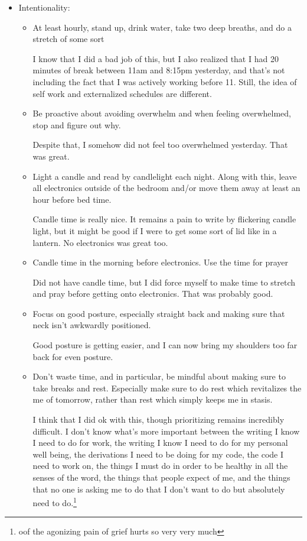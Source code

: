 \documentclass[12pt]{article}[titlepage]
\renewcommand{\,}{\textsuperscript{,}}
\begin{document}
\begin{itemize}   
\item Intentionality:  
\begin{itemize}  
\item At least hourly, stand up, drink water, take two deep breaths, and do a stretch of some sort

I know that I did a bad job of this, but I also realized that I had 20 minutes of break between 11am and 8:15pm yesterday, and that's not including the fact that I was actively working before 11. Still, the idea of self work and externalized schedules are different.  
\item Be proactive about avoiding overwhelm and when feeling overwhelmed, stop and figure out why.

Despite that, I somehow did not feel too overwhelmed yesterday. That was great.  
\item Light a candle and read by candlelight each night. Along with this, leave all electronics outside of the bedroom and/or move them away at least an hour before bed time.

Candle time is really nice.  
It remains a pain to write by flickering candle light, but it might be good if I were to get some sort of lid like in a lantern.  
No electronics was great too.  
\item Candle time in the morning before electronics. Use the time for prayer

Did not have candle time, but I did force myself to make time to stretch and pray before getting onto electronics.  
That was probably good.  
\item Focus on good posture, especially straight back and making sure that neck isn't awkwardly positioned.

Good posture is getting easier, and I can now bring my shoulders too far back for even posture.

\item Don't waste time, and in particular, be mindful about making sure to take breaks and rest. Especially make sure to do rest which revitalizes the me of tomorrow, rather than rest which simply keeps me in stasis.

I think that I did ok with this, though prioritizing remains incredibly difficult.  
I don't know what's more important between the writing I know I need to do for work, the writing I know I need to do for my personal well being, the derivations I need to be doing for my code, the code I need to work on, the things I must do in order to be healthy in all the senses of the word, the things that people expect of me, and the things that no one is asking me to do that I don't want to do but absolutely need to do.\footnote{oof the agonizing pain of grief hurts so very very much}


\end{itemize}
\end{itemize}
\end{document}
